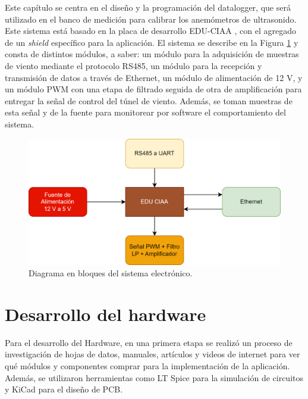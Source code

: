 Este capítulo se centra en el diseño y la programación del datalogger, que será utilizado en el banco de medición para calibrar los anemómetros de ultrasonido. Este sistema está basado en la placa de desarrollo EDU-CIAA \cite{proyectoCIAA}, con el agregado de un \textit{shield} específico para la aplicación. El sistema se describe en la Figura \ref{fig:esquemaHardware} y consta de distintos módulos, a saber: un módulo para la adquisición de muestras de viento mediante el protocolo RS485, un módulo para la recepción y transmisión de datos a través de Ethernet, un módulo de alimentación de 12 \unit{\volt}, y un módulo PWM con una etapa de filtrado seguida de otra de amplificación para entregar la señal de control del túnel de viento. Además, se toman muestras de esta señal y de la fuente para monitorear por software el comportamiento del sistema.


\begin{figure}[H]
    \centering
    \includegraphics[width=0.85\linewidth]{Figuras/datalogger/esquemaHardarware.png}
    \caption{Diagrama en bloques del sistema electrónico.}
    \label{fig:esquemaHardware}
\end{figure}




\section{Desarrollo del hardware}\label{sec:desarrolloHardware}


Para el desarrollo del Hardware, en una primera etapa se realizó un proceso de investigación de hojas de datos, manuales, artículos y videos de internet para ver qué módulos y componentes comprar para la implementación de la aplicación. Además, se utilizaron herramientas como LT Spice para la simulación de circuitos y KiCad para el diseño de PCB. 


